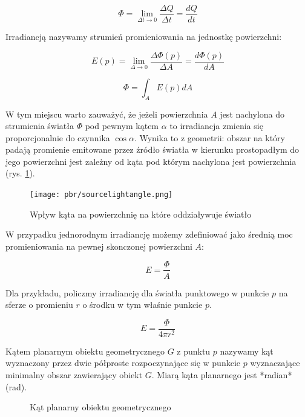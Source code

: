 \documentclass[../main.tex]{subfiles}
\begin{document}
$$
\Phi = \lim_{\Delta t \rightarrow 0}{
    \frac{\Delta Q}{\Delta t}=\frac{dQ}{dt}
}
$$

Irradiancją nazywamy strumień promieniowania na jednostkę powierzchni:

$$
E(p) =
    \lim_{\Delta \rightarrow 0} {
        \frac{\Delta \Phi(p)}{\Delta A}
    } =
    \frac{d\Phi(p)}{dA}
$$

$$
\Phi = \int_{A} {
    E(p)
    dA
}
$$

W tym miejscu warto zauważyć, że jeżeli powierzchnia $A$ jest nachylona do
strumienia światła $\Phi$ pod pewnym kątem $\alpha$ to irradiancja zmienia się
proporcjonalnie do czynnika $\cos \alpha$. Wynika to z geometrii: obszar na
który padają promienie emitowane przez źródło światła w kierunku prostopadłym
do jego powierzchni jest zależny od kąta pod którym nachylona jest
powierzchnia (rys. \ref{fig:SourceLightAngle}).

\begin{figure}[ht]
  \centering
  \texttt{[image: pbr/sourcelightangle.png]}
  \caption{Wpływ kąta na powierzchnię na które oddziaływuje światło}
  \label{fig:SourceLightAngle}
\end{figure}

W przypadku jednorodnym irradiancję możemy zdefiniować jako średnią moc
promieniowania na pewnej skonczonej powierzchni $A$:

$$
E = \frac{\Phi}{A}
$$

Dla przykładu, policzmy irradiancję dla światła punktowego w punkcie $p$ na
sferze o promieniu $r$ o środku w tym właśnie punkcie $p$.

$$ E = \frac{\Phi}{4 \pi r^2} $$

Kątem planarnym obiektu geometrycznego $G$ z punktu $p$ nazywamy kąt wyznaczony
przez dwie półproste rozpoczynające się w punkcie $p$ wyznaczające minimalny
obszar zawierający obiekt $G$. Miarą kąta planarnego jest *radian* (rad).

\begin{figure}[ht]
  \centering
  \caption{Kąt planarny obiektu geometrycznego}
  \label{fig:PlanarAngle}
\end{figure}
\end{document}
